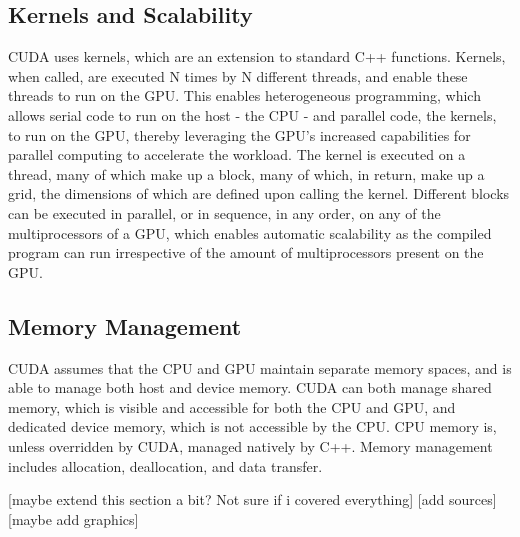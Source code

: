 \subsection{Kernels and Scalability}
CUDA uses kernels, which are an extension to standard C++ functions. Kernels, when called, are executed N times by N different threads, and enable these threads to run on the GPU. This enables heterogeneous programming, which allows serial code to run on the host - the CPU - and parallel code, the kernels, to run on the GPU, thereby leveraging the GPU's increased capabilities for parallel computing to accelerate the workload. The kernel is executed on a thread, many of which make up a block, many of which, in return, make up a grid, the dimensions of which are defined upon calling the kernel. Different blocks can be executed in parallel, or in sequence, in any order, on any of the multiprocessors of a GPU, which enables automatic scalability as the compiled program can run irrespective of the amount of multiprocessors present on the GPU.~\parencite{nvidia_cuda_nodate}


\subsection{Memory Management}
CUDA assumes that the CPU and GPU maintain separate memory spaces, and is able to manage both host and device memory. CUDA can both manage shared memory, which is visible and accessible for both the CPU and GPU, and dedicated device memory, which is not accessible by the CPU. CPU memory is, unless overridden by CUDA, managed natively by C++. Memory management includes allocation, deallocation, and data transfer.~\parencite{nvidia_cuda_nodate}

[maybe extend this section a bit? Not sure if i covered everything]
[add sources]
[maybe add graphics]



